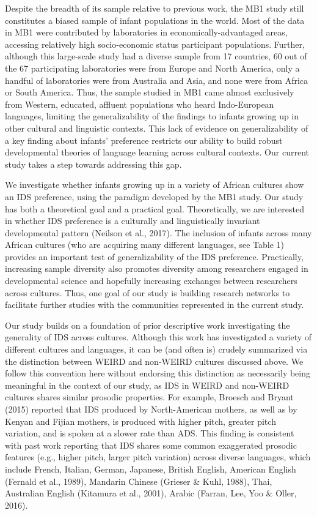 \documentclass[
  ,man,floatsintext]{apa6}
\begin{document}
Despite the breadth of its sample relative to previous work, the MB1 study still constitutes a biased sample of infant populations in the world. Most of the data in MB1 were contributed by laboratories in economically-advantaged areas, accessing relatively high socio-economic status participant populations. Further, although this large-scale study had a diverse sample from 17 countries, 60 out of the 67 participating laboratories were from Europe and North America, only a handful of laboratories were from Australia and Asia, and none were from Africa or South America. Thus, the sample studied in MB1 came almost exclusively from Western, educated, affluent populations who heard Indo-European languages, limiting the generalizability of the findings to infants growing up in other cultural and linguistic contexts. This lack of evidence on generalizability of a key finding about infants' preference restricts our ability to build robust developmental theories of language learning across cultural contexts. Our current study takes a step towards addressing this gap.

We investigate whether infants growing up in a variety of African cultures show an IDS preference, using the paradigm developed by the MB1 study. Our study has both a theoretical goal and a practical goal. Theoretically, we are interested in whether IDS preference is a culturally and linguistically invariant developmental pattern (Neilson et al., 2017). The inclusion of infants across many African cultures (who are acquiring many different languages, see Table 1) provides an important test of generalizability of the IDS preference. Practically, increasing sample diversity also promotes diversity among researchers engaged in developmental science and hopefully increasing exchanges between researchers across cultures. Thus, one goal of our study is building research networks to facilitate further studies with the communities represented in the current study.

Our study builds on a foundation of prior descriptive work investigating the generality of IDS across cultures. Although this work has investigated a variety of different cultures and languages, it can be (and often is) crudely summarized via the distinction between WEIRD and non-WEIRD cultures discussed above. We follow this convention here without endorsing this distinction as necessarily being meaningful in the context of our study, as IDS in WEIRD and non-WEIRD cultures shares similar prosodic properties. For example, Broesch and Bryant (2015) reported that IDS produced by North-American mothers, as well as by Kenyan and Fijian mothers, is produced with higher pitch, greater pitch variation, and is spoken at a slower rate than ADS. This finding is consistent with past work reporting that IDS shares some common exaggerated prosodic features (e.g., higher pitch, larger pitch variation) across diverse languages, which include French, Italian, German, Japanese, British English, American English (Fernald et al., 1989), Mandarin Chinese (Grieser \& Kuhl, 1988), Thai, Australian English (Kitamura et al., 2001), Arabic (Farran, Lee, Yoo \& Oller, 2016).
\end{document}
